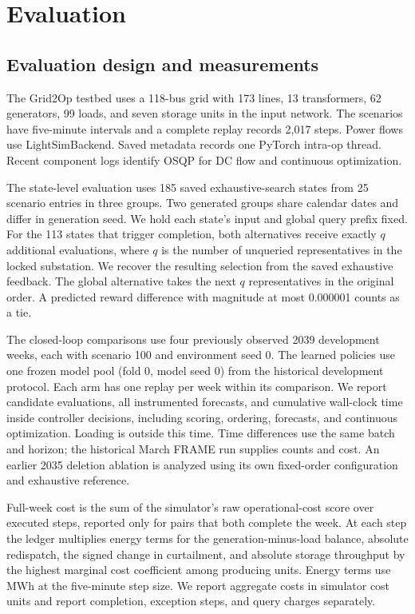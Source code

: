 \documentclass[sigconf,review,anonymous]{acmart}
\begin{document}
\section{Evaluation}

\subsection{Evaluation design and measurements}
The Grid2Op testbed uses a 118-bus grid with 173 lines, 13 transformers, 62 generators, 99 loads, and seven storage units in the input network. The scenarios have five-minute intervals and a complete replay records 2,017 steps. Power flows use LightSimBackend. Saved metadata records one PyTorch intra-op thread. Recent component logs identify OSQP for DC flow and continuous optimization.

The state-level evaluation uses 185 saved exhaustive-search states from 25 scenario entries in three groups. Two generated groups share calendar dates and differ in generation seed. We hold each state's input and global query prefix fixed. For the 113 states that trigger completion, both alternatives receive exactly \(q\) additional evaluations, where \(q\) is the number of unqueried representatives in the locked substation. We recover the resulting selection from the saved exhaustive feedback. The global alternative takes the next \(q\) representatives in the original order. A predicted reward difference with magnitude at most 0.000001 counts as a tie.

The closed-loop comparisons use four previously observed 2039 development weeks, each with scenario 100 and environment seed 0. The learned policies use one frozen model pool (fold 0, model seed 0) from the historical development protocol. Each arm has one replay per week within its comparison. We report candidate evaluations, all instrumented forecasts, and cumulative wall-clock time inside controller decisions, including scoring, ordering, forecasts, and continuous optimization. Loading is outside this time. Time differences use the same batch and horizon; the historical March FRAME run supplies counts and cost. An earlier 2035 deletion ablation is analyzed using its own fixed-order configuration and exhaustive reference.

Full-week cost is the sum of the simulator's raw operational-cost score over executed steps, reported only for pairs that both complete the week. At each step the ledger multiplies energy terms for the generation-minus-load balance, absolute redispatch, the signed change in curtailment, and absolute storage throughput by the highest marginal cost coefficient among producing units. Energy terms use MWh at the five-minute step size. We report aggregate costs in simulator cost units and report completion, exception steps, and query charges separately.
\end{document}
